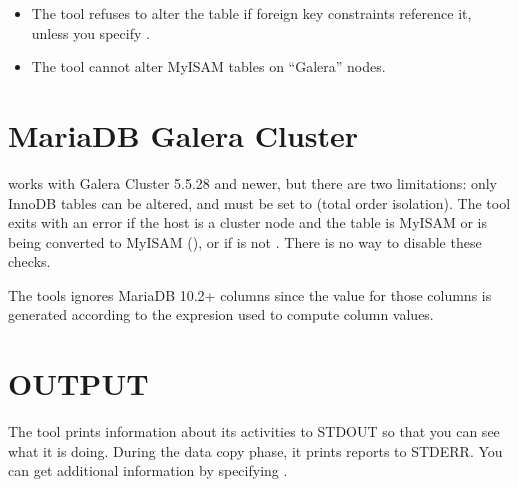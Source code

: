 \documentclass[letterpaper,10pt,english]{sphinxmanual}
\begin{document}
\begin{itemize}
\item {} 
\sphinxAtStartPar
The tool refuses to alter the table if foreign key constraints reference it,
unless you specify {\hyperref[\detokenize{mariadb-schema-change:cmdoption-mariadb-schema-change-alter-foreign-keys-method}]{}}.

\item {} 
\sphinxAtStartPar
The tool cannot alter MyISAM tables on “Galera” nodes.

\end{itemize}


\section{MariaDB Galera Cluster}
\label{\detokenize{mariadb-schema-change:mariadb-galera-cluster}}
\sphinxAtStartPar
{} works with Galera Cluster 5.5.28
and newer, but there are two limitations: only InnoDB tables can be altered,
and  must be set to  (total order isolation).
The tool exits with an error if the host is a cluster node and the table
is MyISAM or is being converted to MyISAM (), or if
 is not .  There is no way to disable these checks.

\sphinxAtStartPar
The tools ignores MariaDB 10.2+  columns since the value for those columns
is generated according to the expresion used to compute column values.


\section{OUTPUT}
\label{\detokenize{mariadb-schema-change:output}}
\sphinxAtStartPar
The tool prints information about its activities to STDOUT so that you can see
what it is doing.  During the data copy phase, it prints {\hyperref[\detokenize{mariadb-schema-change:cmdoption-mariadb-schema-change-progress}]{}}
reports to STDERR.  You can get additional information by specifying
{\hyperref[\detokenize{mariadb-schema-change:cmdoption-mariadb-schema-change-print}]{}}.
\end{document}
